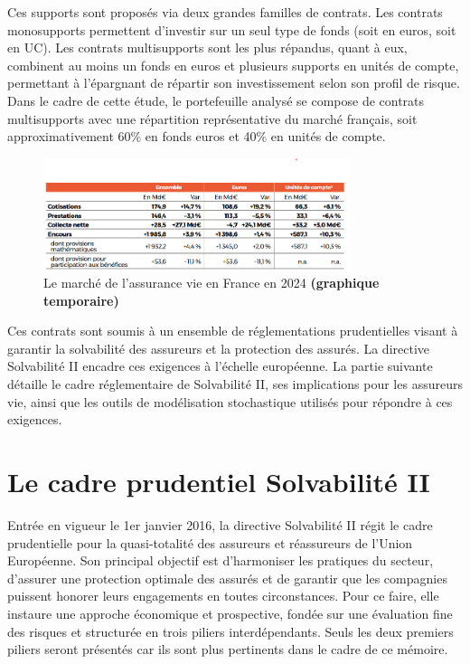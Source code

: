 Ces supports sont proposés via deux grandes familles de contrats. Les contrats monosupports permettent d'investir sur un seul type de fonds (soit en euros, soit en UC). Les contrats multisupports sont les plus répandus, quant à eux, combinent au moins un fonds en euros et plusieurs supports en unités de compte, permettant à l'épargnant de répartir son investissement selon son profil de risque. Dans le cadre de cette étude, le portefeuille analysé se compose de contrats multisupports avec une répartition représentative du marché français, soit approximativement 60\% en fonds euros et 40\% en unités de compte.
\begin{figure}[H]
    \centering
    \includegraphics[width=0.8\textwidth]{images/2_chapitres/chapitre1/assurance-vie-stats.png}
    \caption{Le marché de l'assurance vie en France en 2024 \textbf{(graphique temporaire)}}
    \label{fig:marches_assurance_vie}
\end{figure}

Ces contrats sont soumis à un ensemble de réglementations prudentielles visant à garantir la solvabilité des assureurs et la protection des assurés. La directive Solvabilité II encadre ces exigences à l'échelle européenne. La partie suivante détaille le cadre réglementaire de Solvabilité II, ses implications pour les assureurs vie, ainsi que les outils de modélisation stochastique utilisés pour répondre à ces exigences.

\section{Le cadre prudentiel Solvabilité II}
\label{sec:s2}

Entrée en vigueur le 1er janvier 2016, la directive Solvabilité II régit le cadre prudentielle pour la quasi-totalité des assureurs et réassureurs de l'Union Européenne. Son principal objectif est d'harmoniser les pratiques du secteur, d'assurer une protection optimale des assurés et de garantir que les compagnies puissent honorer leurs engagements en toutes circonstances. Pour ce faire, elle instaure une approche économique et prospective, fondée sur une évaluation fine des risques et structurée en trois piliers interdépendants. Seuls les deux premiers piliers seront présentés car ils sont plus pertinents dans le cadre de ce mémoire.


